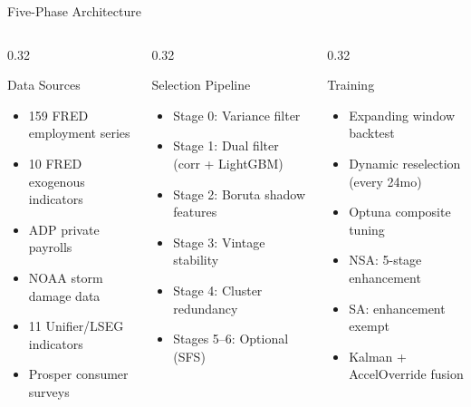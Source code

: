 \documentclass[aspectratio=169,10pt]{beamer}
\begin{document}
\begin{frame}{Five-Phase Architecture}
\vspace{0.2cm}
\begin{columns}[T]
\begin{column}{0.32\textwidth}
\begin{block}{Data Sources}
\scriptsize
\begin{itemize}
  \item 159 FRED employment series
  \item 10 FRED exogenous indicators
  \item ADP private payrolls
  \item NOAA storm damage data
  \item 11 Unifier/LSEG indicators
  \item Prosper consumer surveys
\end{itemize}
\end{block}
\end{column}
\begin{column}{0.32\textwidth}
\begin{block}{Selection Pipeline}
\scriptsize
\begin{itemize}
  \item Stage 0: Variance filter
  \item Stage 1: Dual filter (corr + LightGBM)
  \item Stage 2: Boruta shadow features
  \item Stage 3: Vintage stability
  \item Stage 4: Cluster redundancy
  \item Stages 5--6: Optional (SFS)
\end{itemize}
\end{block}
\end{column}
\begin{column}{0.32\textwidth}
\begin{block}{Training}
\scriptsize
\begin{itemize}
  \item Expanding window backtest
  \item Dynamic reselection (every 24mo)
  \item Optuna composite tuning
  \item NSA: 5-stage enhancement
  \item SA: enhancement exempt
  \item Kalman + AccelOverride fusion
\end{itemize}
\end{block}
\end{column}
\end{columns}
\end{frame}
\end{document}

